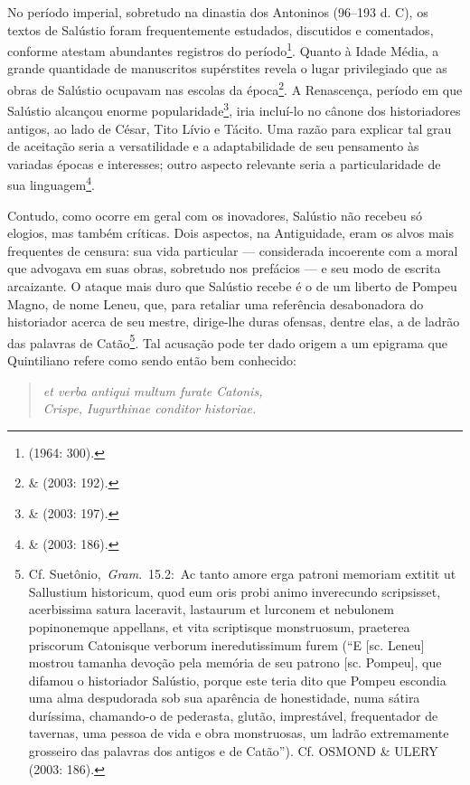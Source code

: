 No período imperial, sobretudo na dinastia dos Antoninos (96--193 d. C), os
textos de Salústio foram frequentemente estudados, discutidos e comentados,
conforme atestam abundantes registros do período\footnote{ (1964: 300).}.
Quanto à Idade Média, a grande quantidade de manuscritos supérstites revela o
lugar privilegiado que as obras de Salústio ocupavam nas escolas da
época\footnote{ \&  (2003: 192).}. A Renascença, período em que
Salústio alcançou enorme popularidade\footnote{ \&  (2003: 197).},
iria incluí-lo no cânone dos historiadores antigos, ao lado de César, Tito
Lívio e Tácito. Uma razão para explicar tal grau de aceitação seria a
versatilidade e a adaptabilidade de seu pensamento às variadas épocas e
interesses; outro aspecto relevante seria a particularidade de sua
linguagem\footnote{  \&  (2003: 186).}. 

Contudo, como ocorre em geral com os inovadores, Salústio não recebeu só
elogios, mas também críticas. Dois aspectos, na Antiguidade, eram os alvos mais
frequentes de censura: sua vida particular --- considerada incoerente com a
moral que advogava em suas obras, sobretudo nos prefácios --- e seu modo de 
escrita arcaizante.  O ataque mais duro que Salústio recebe é o de um liberto
de Pompeu Magno, de nome Leneu, que, para retaliar uma referência desabonadora
do historiador acerca de seu mestre, dirige-lhe duras ofensas, dentre elas, a
de ladrão das palavras de Catão\footnote{Cf. Suetônio, \emph{Gram}. 15.2: Ac tanto amore erga patroni memoriam extitit ut Sallustium historicum, quod eum oris probi animo inverecundo scripsisset, acerbissima satura laceravit, lastaurum et lurconem et nebulonem popinonemque appellans, et vita scriptisque monstruosum, praeterea priscorum Catonisque verborum ineredutissimum furem
(“E [sc. Leneu] mostrou tamanha devoção pela memória de seu patrono [sc. Pompeu], que difamou o historiador Salústio, porque este teria dito que Pompeu escondia uma alma despudorada sob sua aparência de honestidade, numa sátira duríssima, chamando-o de pederasta, glutão, imprestável, frequentador de tavernas, uma pessoa de vida e obra monstruosas, um ladrão extremamente grosseiro das palavras dos antigos e de Catão”). Cf. OSMOND & ULERY (2003: 186).}. Tal acusação pode ter dado origem a um epigrama que
Quintiliano refere como sendo então bem conhecido: 

\begin{verse}
\emph{et verba antiqui
multum furate Catonis,\\ Crispe, Iugurthinae conditor historiae.} 

\end{verse}
 


